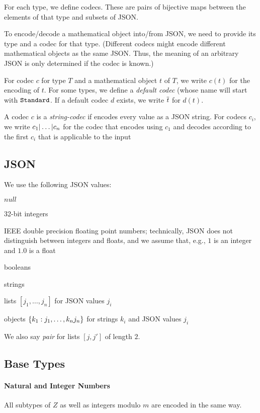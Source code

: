 For each type, we define codecs. These are pairs of bijective maps between the elements of that type and subsets of JSON.

To encode/decode a mathematical object into/from JSON, we need to provide its type and a codec for that type.
(Different codecs might encode different mathematical objects as the same JSON. Thus, the meaning of an arbitrary JSON is only determined if the codec is known.)

For codec $c$ for type $T$ and a mathematical object $t$ of $T$, we write $c(t)$ for the encoding of $t$.
For some types, we define a \emph{default codec} (whose name will start with $\cn{Standard}$.
If a default codec $d$ exists, we write $\ov{t}$ for $d(t)$.

A codec $c$ is a \emph{string-codec} if encodes every value as a JSON string.
For codecs $c_i$, we write $\cunion{c_1,\ldots,c_n}$ for the codec that encodes using $c_1$ and decodes according to the first $c_i$ that is applicable to the input

\subsection{JSON}

We use the following JSON values:
\begin{compactitem}
  \item $null$
  \item 32-bit integers
  \item IEEE double precision floating point numbers; technically, JSON does not distinguish between integers and floats, and we assume that, e.g., $1$ is an integer and $1.0$ is a float
  \item booleans
  \item strings
  \item lists $[j_1,\ldots,j_n]$ for JSON values $j_i$
  \item objects $\jobj{k_1:j_1,\ldots,k_nj_n}$ for strings $k_i$ and JSON values $j_i$
\end{compactitem}
We also say \emph{pair} for lists $[j,j']$ of length $2$.

\subsection{Base Types}

\paragraph{Natural and Integer Numbers}
All subtypes of $Z$ as well as integers modulo $m$ are encoded in the same way.

